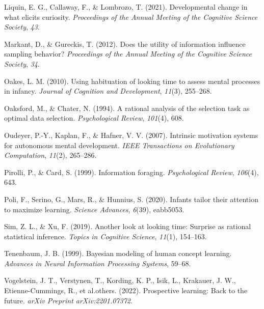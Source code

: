 \documentclass[
  man,floatsintext]{apa6}
\newlength{\cslhangindent}
\newlength{\cslentryspacingunit} %
\newenvironment{CSLReferences}[2] %
 {%
  \setlength{\parindent}{0pt}
  \ifodd #1
  \let\oldpar\par
  \def\par{\hangindent=\cslhangindent\oldpar}
  \fi
  \setlength{\parskip}{#2\cslentryspacingunit}
 }%
 {}
\begin{document}
\begin{CSLReferences}{1}{0}
\leavevmode{}%
Liquin, E. G., Callaway, F., \& Lombrozo, T. (2021). Developmental change in what elicits curiosity. \emph{Proceedings of the Annual Meeting of the Cognitive Science Society}, \emph{43}.

\leavevmode{}%
Markant, D., \& Gureckis, T. (2012). Does the utility of information influence sampling behavior? \emph{Proceedings of the Annual Meeting of the Cognitive Science Society}, \emph{34}.

\leavevmode{}%
Oakes, L. M. (2010). Using habituation of looking time to assess mental processes in infancy. \emph{Journal of Cognition and Development}, \emph{11}(3), 255--268.

\leavevmode{}%
Oaksford, M., \& Chater, N. (1994). A rational analysis of the selection task as optimal data selection. \emph{Psychological Review}, \emph{101}(4), 608.

\leavevmode{}%
Oudeyer, P.-Y., Kaplan, F., \& Hafner, V. V. (2007). Intrinsic motivation systems for autonomous mental development. \emph{IEEE Transactions on Evolutionary Computation}, \emph{11}(2), 265--286.

\leavevmode{}%
Pirolli, P., \& Card, S. (1999). Information foraging. \emph{Psychological Review}, \emph{106}(4), 643.

\leavevmode{}%
Poli, F., Serino, G., Mars, R., \& Hunnius, S. (2020). Infants tailor their attention to maximize learning. \emph{Science Advances}, \emph{6}(39), eabb5053.

\leavevmode{}%
Sim, Z. L., \& Xu, F. (2019). Another look at looking time: Surprise as rational statistical inference. \emph{Topics in Cognitive Science}, \emph{11}(1), 154--163.

\leavevmode{}%
Tenenbaum, J. B. (1999). Bayesian modeling of human concept learning. \emph{Advances in Neural Information Processing Systems}, 59--68.

\leavevmode{}%
Vogelstein, J. T., Verstynen, T., Kording, K. P., Isik, L., Krakauer, J. W., Etienne-Cummings, R., et al.others. (2022). Prospective learning: Back to the future. \emph{arXiv Preprint arXiv:2201.07372}.

\end{CSLReferences}
\end{document}
